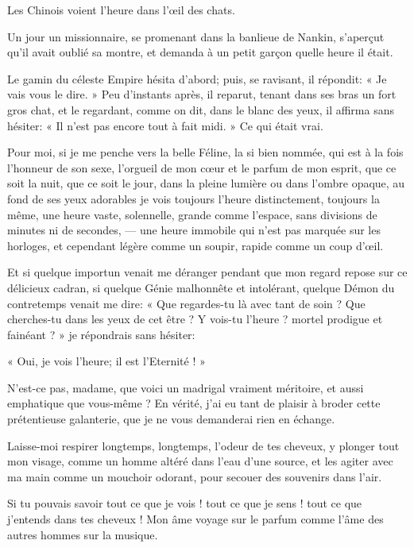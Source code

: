 Les Chinois voient l’heure dans l’\oe il
des chats.

Un jour un missionnaire, se promenant dans la banlieue de Nankin,
s’aperçut qu’il avait oublié sa
montre, et demanda à un petit garçon quelle heure il était.

Le gamin du céleste Empire hésita d’abord; puis, se
ravisant, il répondit: « Je vais vous le dire. » Peu
d’instants après, il reparut, tenant dans ses bras un
fort gros chat, et le regardant, comme on dit, dans le blanc des yeux,
il affirma sans hésiter: « Il n’est pas encore tout à
fait midi. » Ce qui était vrai.

Pour moi, si je me penche vers la belle Féline, la si bien nommée, qui
est à la fois l’honneur de son sexe,
l’orgueil de mon c\oe ur et le parfum de mon esprit, que
ce soit la nuit, que ce soit le jour, dans la pleine lumière ou dans
l’ombre opaque, au fond de ses yeux adorables je vois
toujours l’heure distinctement, toujours la même, une
heure vaste, solennelle, grande comme l’espace, sans
divisions de minutes ni de secondes, --- une heure immobile qui
n’est pas marquée sur les horloges, et cependant
légère comme un soupir, rapide comme un coup d’\oe il.

Et si quelque importun venait me déranger pendant que mon regard repose
sur ce délicieux cadran, si quelque Génie malhonnête et intolérant,
quelque Démon du contretemps venait me dire: « Que regardes{}-tu là
avec tant de soin ? Que cherches{}-tu dans les yeux de cet être ? Y
vois{}-tu l’heure ? mortel prodigue et fainéant ? » je
répondrais sans hésiter:

« Oui, je vois l’heure; il est
l’Eternité ! »

N’est{}-ce pas, madame, que voici un madrigal vraiment
méritoire, et aussi emphatique que vous{}-même ? En vérité,
j’ai eu tant de plaisir à broder cette prétentieuse
galanterie, que je ne vous demanderai rien en échange.


Laisse{}-moi respirer longtemps, longtemps, l’odeur de
tes cheveux, y plonger tout mon visage, comme un homme altéré dans
l’eau d’une source, et les agiter
avec ma main comme un mouchoir odorant, pour secouer des souvenirs dans
l’air.

Si tu pouvais savoir tout ce que je vois ! tout ce que je sens ! tout ce
que j’entends dans tes cheveux ! Mon âme voyage sur le
parfum comme l’âme des autres hommes sur la musique.

